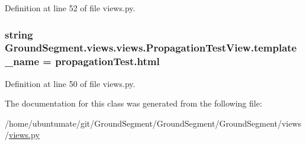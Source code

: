 Definition at line 52 of file views.\+py.

\hypertarget{class_ground_segment_1_1views_1_1views_1_1_propagation_test_view_a19a8c615613c614967f691e639409b02}{}
\subsubsection[{template\+\_\+name}]{\setlength{\rightskip}{0pt plus 5cm}string Ground\+Segment.\+views.\+views.\+Propagation\+Test\+View.\+template\+\_\+name = \textquotesingle{}propagation\+Test.\+html\textquotesingle{}\hspace{0.3cm}{\ttfamily [static]}}\label{class_ground_segment_1_1views_1_1views_1_1_propagation_test_view_a19a8c615613c614967f691e639409b02}


Definition at line 50 of file views.\+py.



The documentation for this class was generated from the following file\+:\begin{DoxyCompactItemize}
\item 
/home/ubuntumate/git/\+Ground\+Segment/\+Ground\+Segment/\+Ground\+Segment/views/\hyperlink{views_8py}{views.\+py}\end{DoxyCompactItemize}
